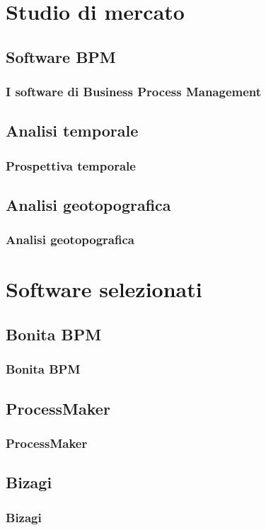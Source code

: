 \documentclass[compress,9pt]{beamer}
\begin{document}
\section{Studio di mercato}
\subsection{Software BPM}
\begin{frame}%
\frametitle{I software di Business Process Management}
\end{frame}

\subsection{Analisi temporale}
\begin{frame}%
\frametitle{Prospettiva temporale}
\end{frame}

\subsection{Analisi geotopografica}
\begin{frame}%
\frametitle{Analisi geotopografica}
\end{frame}

\section{Software selezionati}
\newcommand{\progname}{Bonita BPM}
\subsection{\progname}
\begin{frame}%
\frametitle{\progname}
\end{frame}

\renewcommand{\progname}{ProcessMaker}
\subsection{\progname}
\begin{frame}%
\frametitle{\progname}
\end{frame}

\renewcommand{\progname}{Bizagi}
\subsection{\progname}
\begin{frame}%
\frametitle{\progname}
\end{frame}
\end{document}
